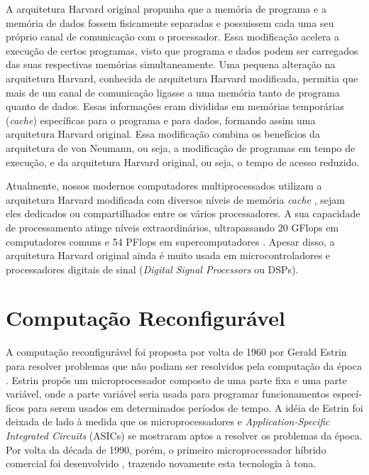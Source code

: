 \documentclass[11pt,a4paper,oneside]{book}
\begin{document}
A arquitetura Harvard original propunha que a mem\'oria de programa e a mem\'oria de dados fossem fisicamente separadas e possuissem cada uma seu pr\'oprio canal de comunica\c{c}\~ao com o processador.
Essa modifica\c{c}\~ao acelera a execu\c{c}\~ao de certos programas, visto que programa e dados podem ser carregados das suas respectivas mem\'orias simultaneamente.
Uma pequena altera\c{c}\~ao na arquitetura Harvard, conhecida de arquitetura Harvard modificada, permitia que mais de um canal de comunica\c{c}\~ao ligasse a uma mem\'oria tanto de programa quanto de dados.
Essas informa\c{c}\~oes eram divididas em mem\'orias tempor\'arias (\textit{cache}) espec\'i­ficas para o programa e para dados, formando assim uma arquitetura Harvard original.
Essa modifica\c{c}\~ao combina os benef\'i­cios da arquitetura de von Neumann, ou seja, a modifica\c{c}\~ao de programas em tempo de execu\c{c}\~ao, e da arquitetura Harvard original, ou seja, o tempo de acesso reduzido.

Atualmente, nossos modernos computadores multiprocessados utilizam a arquitetura Harvard modificada com diversos n\'i­veis de mem\'oria \textit{cache} \cite{Hennessy2011}, sejam eles dedicados ou compartilhados entre os v\'arios processadores.
A sua capacidade de processamento atinge n\'i­veis extraordin\'arios, ultrapassando 20 GFlops em computadores comuns \cite{MaxxPI2013} e 54 PFlops em supercomputadores \cite{Top5002013}.
Apesar disso, a arquitetura Harvard original ainda \'e muito usada em microcontroladores e processadores digitais de sinal (\textit{Digital Signal Processors} ou DSPs).

\section{Computa\c{c}\~ao Reconfigur\'avel}
\label{ss:computacao_reconfiguravel}

A computa\c{c}\~ao reconfigur\'avel foi proposta por volta de 1960 por Gerald Estrin para resolver problemas que n\~ao podiam ser resolvidos pela computa\c{c}\~ao da \'epoca \cite{Estrin2002}.
Estrin prop\^os um microprocessador composto de uma parte fixa e uma parte vari\'avel, onde a parte vari\'avel seria usada para programar funcionamentos espec\'i­ficos para serem usados em determinados per\'i­odos de tempo.
A id\'eia de Estrin foi deixada de lado \`a medida que os microprocessadores e \textit{Application-Specific Integrated Circuits} (ASICs) se mostraram aptos a resolver os problemas da \'epoca.
Por volta da d\'ecada de 1990, por\'em, o primeiro microprocessador h\'i­brido comercial foi desenvolvido \cite{Estrin2002}, trazendo novamente esta tecnologia \`a tona.
\end{document}
